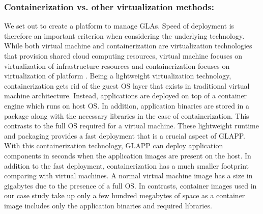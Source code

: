 \documentclass{seal_thesis}
\begin{document}
\subsubsection{Containerization vs. other virtualization methods:}
We set out to create a platform to manage GLAs.
Speed of deployment is therefore an important criterion when considering the underlying technology.
While both virtual machine and containerization are virtualization technologies that provision shared cloud computing resources, virtual machine focuses on virtualization of infrastructure resources and containerization focuses on virtualization of platform \cite{pahl2015containerisation}.
Being a lightweight virtualization technology, containerization gets rid of the guest OS layer that exists in traditional virtual machine architecture.
Instead, applications are deployed on top of a container engine which runs on host OS.
In addition, application binaries are stored in a package along with the necessary libraries in the case of containerization.
This contrasts to the full OS required for a virtual machine.
These lightweight runtime and packaging provides a fast deployment that is a crucial aspect of GLAPP.
With this containerization technology, GLAPP can deploy application components in seconds when the application images are present on the host.
In addition to the fast deployment, containerization has a much smaller footprint comparing with virtual machines.
A normal virtual machine image has a size in gigabytes due to the presence of a full OS.
In contrasts, container images used in our case study take up only a few hundred megabytes of space as a container image includes only the application binaries and required libraries.



\end{document}
